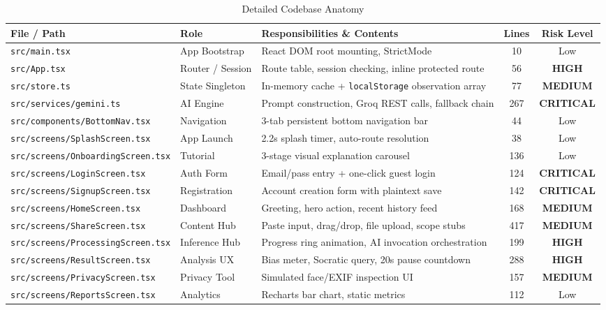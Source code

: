 \documentclass[10pt,a4paper]{report}
\newcommand{\badgeCrit}{\colorbox{red!20}{\textcolor{critRed}{\bfseries\scriptsize CRITICAL}}}
\newcommand{\badgeHigh}{\colorbox{orange!20}{\textcolor{critRed!80!orange}{\bfseries\scriptsize HIGH}}}
\newcommand{\badgeMed}{\colorbox{yellow!30}{\textcolor{warnOrange!80!black}{\bfseries\scriptsize MEDIUM}}}
\begin{document}
\begin{table}[htbp]
\centering
\scriptsize
\caption{Detailed Codebase Anatomy}
\begin{tabularx}{\textwidth}{l p{2.5cm} X c c}
\toprule
\textbf{File / Path} & \textbf{Role} & \textbf{Responsibilities \& Contents} & \textbf{Lines} & \textbf{Risk Level} \\
\midrule
\texttt{src/main.tsx} & App Bootstrap & React DOM root mounting, StrictMode & 10 & Low \\
\texttt{src/App.tsx} & Router / Session & Route table, session checking, inline protected route & 56 & \badgeHigh \\
\texttt{src/store.ts} & State Singleton & In-memory cache + \texttt{localStorage} observation array & 77 & \badgeMed \\
\texttt{src/services/gemini.ts} & AI Engine & Prompt construction, Groq REST calls, fallback chain & 267 & \badgeCrit \\
\texttt{src/components/BottomNav.tsx} & Navigation & 3-tab persistent bottom navigation bar & 44 & Low \\
\texttt{src/screens/SplashScreen.tsx} & App Launch & 2.2s splash timer, auto-route resolution & 38 & Low \\
\texttt{src/screens/OnboardingScreen.tsx} & Tutorial & 3-stage visual explanation carousel & 136 & Low \\
\texttt{src/screens/LoginScreen.tsx} & Auth Form & Email/pass entry + one-click guest login & 124 & \badgeCrit \\
\texttt{src/screens/SignupScreen.tsx} & Registration & Account creation form with plaintext save & 142 & \badgeCrit \\
\texttt{src/screens/HomeScreen.tsx} & Dashboard & Greeting, hero action, recent history feed & 168 & \badgeMed \\
\texttt{src/screens/ShareScreen.tsx} & Content Hub & Paste input, drag/drop, file upload, scope stubs & 417 & \badgeMed \\
\texttt{src/screens/ProcessingScreen.tsx} & Inference Hub & Progress ring animation, AI invocation orchestration & 199 & \badgeHigh \\
\texttt{src/screens/ResultScreen.tsx} & Analysis UX & Bias meter, Socratic query, 20s pause countdown & 288 & \badgeHigh \\
\texttt{src/screens/PrivacyScreen.tsx} & Privacy Tool & Simulated face/EXIF inspection UI & 157 & \badgeMed \\
\texttt{src/screens/ReportsScreen.tsx} & Analytics & Recharts bar chart, static metrics & 112 & Low \\

\end{tabularx}
\end{table}
\end{document}
